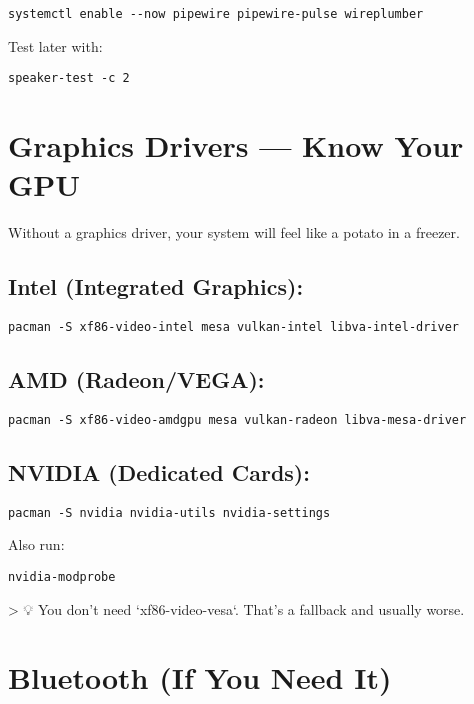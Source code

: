 \documentclass[12pt,openany]{book}
\begin{document}
\begin{lstlisting}
systemctl enable --now pipewire pipewire-pulse wireplumber
\end{lstlisting}

Test later with:

\begin{lstlisting}
speaker-test -c 2
\end{lstlisting}

\section{Graphics Drivers — Know Your GPU}

Without a graphics driver, your system will feel like a potato in a freezer.

\subsection*{Intel (Integrated Graphics):}

\begin{lstlisting}
pacman -S xf86-video-intel mesa vulkan-intel libva-intel-driver
\end{lstlisting}

\subsection*{AMD (Radeon/VEGA):}

\begin{lstlisting}
pacman -S xf86-video-amdgpu mesa vulkan-radeon libva-mesa-driver
\end{lstlisting}

\subsection*{NVIDIA (Dedicated Cards):}

\begin{lstlisting}
pacman -S nvidia nvidia-utils nvidia-settings
\end{lstlisting}

Also run:

\begin{lstlisting}
nvidia-modprobe
\end{lstlisting}

> 💡 You don’t need `xf86-video-vesa`. That’s a fallback and usually worse.

\section{Bluetooth (If You Need It)}
\end{document}
